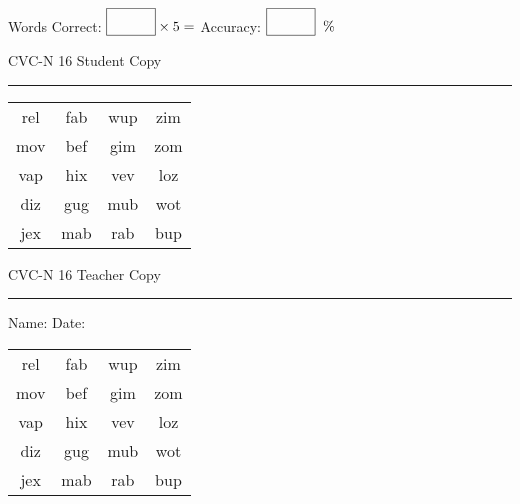 \documentclass{memoir}
\begin{document}
\small

Words Correct: $\fbox{\phantom{\huge 100}} \times 5 = $ Accuracy: $\fbox{\phantom{\huge 100}}\;\; \%$ 

\vfill

\newpage


\footnotesize \noindent
CVC-N 16 \hfill Student Copy
\smallskip
\hrule

\Large

\setlength{\tabcolsep}{14pt}
\def\arraystretch{2}

{\selectfont


\begin{vplace}[0.5]
\begin{center}
\begin{tabular}{cccc}
rel & fab & wup & zim \\
mov & bef & gim & zom \\
vap & hix & vev & loz \\
diz & gug & mub & wot \\
jex & mab & rab & bup \\
\end{tabular}
\end{center}
\end{vplace}

}

\newpage

\footnotesize \noindent
CVC-N 16 \hfill Teacher Copy
\smallskip
\hrule

\small

\vfill

\noindent
Name: \underline{\hspace{1.75in}} \hfill Date: \underline{\hspace{1in}}

\Large

{\selectfont


\begin{vplace}[0.5]
\begin{center}
\begin{tabular}{cccc}
rel & fab & wup & zim \\
mov & bef & gim & zom \\
vap & hix & vev & loz \\
diz & gug & mub & wot \\
jex & mab & rab & bup \\
\end{tabular}
\end{center}
\end{vplace}



}
\end{document}
